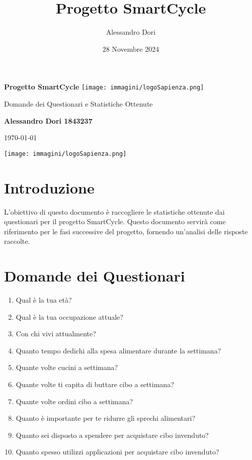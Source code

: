 \documentclass[a4paper,12pt]{article}
\title{Progetto SmartCycle}
\author{Alessandro Dori}
\date{28 Novembre 2024}
\begin{document}
\begin{titlepage}
    \centering
    \vspace*{2cm}
    
    \Huge
    \textbf{Progetto SmartCycle}
    \texttt{[image: immagini/logoSapienza.png]}
    
    \vspace{1.5cm}
    
    \LARGE
    Domande dei Questionari e Statistiche Ottenute
    
    \Large
    \textbf{Alessandro Dori 1843237}
    
    \vspace{0.8cm}
    
    \Large
    \today
    
    \vspace{2cm}
    
    \texttt{[image: immagini/logoSapienza.png]}
    
\end{titlepage}

\tableofcontents
\newpage

\section{Introduzione}
L'obiettivo di questo documento è raccogliere le statistiche ottenute dai questionari per il progetto SmartCycle.
Questo documento servirà come riferimento per le fasi successive del progetto, fornendo un'analisi delle risposte raccolte.

\section{Domande dei Questionari}
\begin{enumerate}
    \item Qual è la tua età?
    \item Qual è la tua occupazione attuale?
    \item Con chi vivi attualmente?
    \item Quanto tempo dedichi alla spesa alimentare durante la settimana?
    \item Quante volte cucini a settimana?
    \item Quante volte ti capita di buttare cibo a settimana?
    \item Quante volte ordini cibo a settimana?
    \item Quanto è importante per te ridurre gli sprechi alimentari?
    \item Quanto sei disposto a spendere per acquistare cibo invenduto?
    \item Quanto spesso utilizzi applicazioni per acquistare cibo invenduto?
\end{enumerate}
\end{document}
